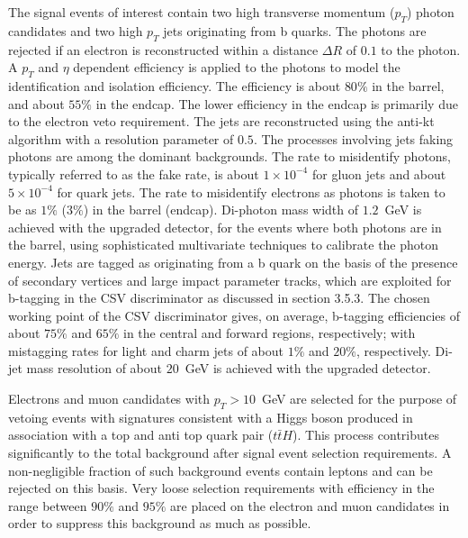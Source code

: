 The signal events of interest contain two high transverse momentum ($p_{T}$) photon candidates and two high $p_{T}$ jets originating from b quarks. The photons are rejected if an electron is reconstructed within a distance $\Delta R$ of $0.1$ to the photon.  A $p_{T}$ and $\eta$ dependent efficiency is applied to the photons to model the identification and isolation efficiency. The efficiency is about $80\%$ in the barrel, and about $55\%$ in the endcap. The lower efficiency in the endcap is primarily due to the electron veto requirement.  The jets are reconstructed using the anti-kt algorithm with a resolution parameter of $0.5$. The processes involving jets faking photons are among the dominant backgrounds. The rate to misidentify photons, typically referred to as the fake rate, is about $1 \times 10^{-4}$ for gluon jets and about $5\times 10^{-4}$ for quark jets. The rate to misidentify electrons as photons is taken to be as $1\%$ ($3\%$) in the barrel (endcap). Di-photon mass width of $1.2$~GeV is achieved with the upgraded detector, for the events where both photons are in the barrel, using sophisticated multivariate techniques to calibrate the photon energy.  Jets are tagged as originating from a b quark on the basis of the presence of secondary vertices and large impact parameter tracks, which are exploited for b-tagging in the CSV discriminator as discussed in section 3.5.3. The chosen working point of the CSV discriminator gives, on average, b-tagging efficiencies of about $75\%$ and $65\%$ in the central and forward regions, respectively; with mistagging rates for light and charm jets of about $1\%$ and $20\%$, respectively. Di-jet mass resolution of about $20$~GeV is achieved with the upgraded detector. 

Electrons and muon candidates with $p_{T}>10$~GeV are selected for the purpose of vetoing events with signatures consistent with a Higgs boson produced in association with a top and anti top quark pair ($t\bar{t}H$). This process contributes significantly to the total background after signal event selection requirements. A non-negligible fraction of such background events contain leptons and can be rejected on this basis. Very loose selection requirements with efficiency in the range between $90\%$ and $95\%$ are placed on the electron and muon candidates in order to suppress this background as much as possible.

